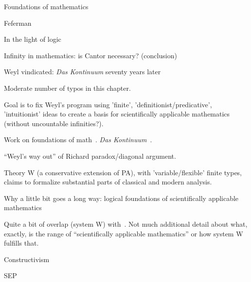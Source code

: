 \begin{plSection}{Foundations of mathematics}
\begin{plSection}{Feferman}
\begin{plSection}{In the light of logic}
\begin{plSection}{Infinity in mathematics: is Cantor necessary? (conclusion)}
\end{plSection}%
\begin{plSection}{Weyl vindicated: \textit{Das Kontinuum} seventy years later}
\label{sec:Weyl_vindicated}

Moderate number of typos in this 
chapter.~\cite[ch~13 ``Weyl vindicated: \textit{Das Kontinuum} seventy years later'']{Feferman:1998:LightOfLogic}

Goal is to fix Weyl's program 
using 'finite', 'definitionist/predicative', 'intuitionist' ideas
to create a basis for scientifically applicable mathematics
(without uncountable infinities?).

Work on foundations of math~\cite{Weyl:1910:Definitionen}.
\textit{Das Kontinuum}~\cite{Weyl:1918:Kontinuum,Weyl:1987:Continuum}.

``Weyl's way out'' of Richard paradox/diagonal 
argument.~\cite[p 262]{Feferman:1998:LightOfLogic} 

Theory W (a conservative extension of PA),
with 'variable/flexible' finite types,
claims to formalize substantial parts of
classical and modern 
analysis.~\cite[ch~13 sec~8]{Feferman:1998:LightOfLogic}

\end{plSection}%
\begin{plSection}{Why a little bit goes a long way:
logical foundations of scientifically applicable mathematics}
\label{sec:Why_a_little_bit_goes_a_long_way}

\cite[ch~14 ``Why a little bit goes a long way:
logical foundations of scientifically applicable mathematics'']{Feferman:1998:LightOfLogic}

Quite a bit of overlap (system W) 
with~\cite[ch 13]{Feferman:1998:LightOfLogic}.
Not much additional detail about what, exactly,
is the range of ``scientifically applicable mathematics''
or how system W fulfills that.

\end{plSection}%
\end{plSection}%
\end{plSection}%
\begin{plSection}{Constructivism}
\label{sec:Constructivism}
\begin{plSection}{SEP}
\label{sec:Constructivism_SEP}
\cite{sep:ConstructiveMathematics}


\end{plSection}
\end{plSection}
\end{plSection}
